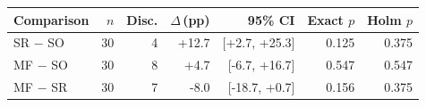 \begin{tabular}{@{}lrrrrrr@{}}
\toprule
Comparison & $n$ & Disc. & $\Delta$\,(pp) & 95\% CI & Exact $p$ & Holm $p$ \\
\midrule
SR $-$ SO & 30 & 4 & +12.7 & [+2.7, +25.3] & 0.125 & 0.375 \\
MF $-$ SO & 30 & 8 & +4.7 & [-6.7, +16.7] & 0.547 & 0.547 \\
MF $-$ SR & 30 & 7 & -8.0 & [-18.7, +0.7] & 0.156 & 0.375 \\
\bottomrule
\end{tabular}
